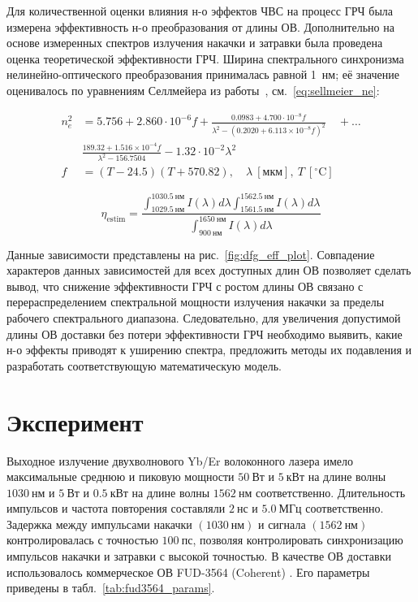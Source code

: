 Для количественной оценки влияния н-о эффектов ЧВС на процесс ГРЧ была измерена эффективность н-о преобразования от длины ОВ. Дополнительно на основе измеренных спектров излучения накачки и затравки была проведена оценка теоретической эффективности ГРЧ. Ширина спектрального синхронизма нелинейно-оптического преобразования принималась равной 1~нм; её значение оценивалось по уравнениям Селлмейера из работы~\cite{gayer2008temperature}, см.~\eqref{eq:sellmeier_ne}:

\begin{align}
	n_e^2 &= 5.756 + 2.860\cdot10^{-6}f + \frac{0.0983 + 4.700\cdot10^{-8}f}{\lambda^2 - (0.2020 + 6.113\times10^{-8}f)^2} \quad +\ldots\nonumber\\
	&\frac{189.32 + 1.516\times10^{-4}f}{\lambda^2 - 156.7504} - 1.32\cdot10^{-2}\lambda^2\label{eq:sellmeier_ne}\\
	f &= (T - 24.5)(T + 570.82), \quad \lambda\ [\text{мкм}],\ T\ [^\circ\text{C}]	
\end{align}


\begin{equation}\label{eq:norm_est_eff}
	\eta_{\text{estim}} = \dfrac{\int_{1029.5~\text{нм}}^{1030.5~\text{нм}}{I\left(\lambda\right)d\lambda}\int_{1561.5~\text{нм}}^{1562.5~\text{нм}}{I\left(\lambda\right)d\lambda}}{ \int_{900~\text{нм}}^{1650~\text{нм}}{I\left(\lambda\right)d\lambda}}
\end{equation}


Данные зависимости представлены на рис.~\cref{fig:dfg_eff_plot}. Совпадение характеров данных зависимостей для всех доступных длин ОВ позволяет сделать вывод, что снижение эффективности ГРЧ с ростом длины ОВ связано с перераспределением спектральной мощности излучения накачки за пределы рабочего спектрального диапазона. Следовательно, для увеличения допустимой длины ОВ доставки без потери эффективности ГРЧ необходимо выявить, какие н-о эффекты приводят к уширению спектра, предложить методы их подавления и разработать соответствующую математическую модель.



\section{Эксперимент}\label{sec:nonlin3/exp}

Выходное излучение двухволнового Yb/Er волоконного лазера имело максимальные среднюю и пиковую мощности $50~\text{Вт}$ и $5~\text{кВт}$ на длине волны $1030~\text{нм}$ и $5~\text{Вт}$ и $0.5~\text{кВт}$ на длине волны $1562~\text{нм}$ соответственно. Длительность импульсов и частота повторения составляли $2~\text{нс}$ и $5.0~\text{МГц}$ соответственно. Задержка между импульсами накачки $\left(1030~\text{нм}\right)$ и сигнала $\left(1562~\text{нм}\right)$ контролировалась с точностью $100~\text{пс}$, позволяя контролировать синхронизацию импульсов накачки и затравки с высокой точностью. В качестве ОВ доставки использовалось коммерческое ОВ FUD-3564 (Coherent) \cite{fud3564}. Его параметры приведены в табл.~\cref{tab:fud3564_params}.

